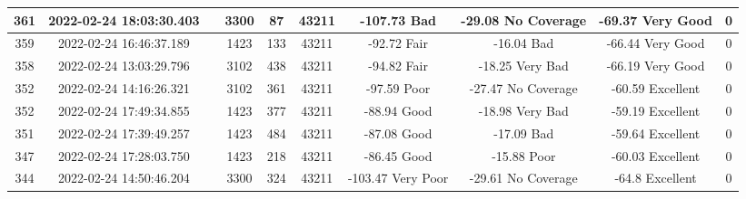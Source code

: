 \begin{longtable*}{|c|c|c|c|c|c|c|c|c|c|}
361&2022-02-24 18:03:30.403&&3300&87&43211& -107.73   Bad         & -29.08    No Coverage & -69.37    Very Good   & 0\\\hline
{}359&2022-02-24 16:46:37.189&&1423&133&43211& -92.72    Fair        & -16.04    Bad         & -66.44    Very Good   & 0\\\hline
{}358&2022-02-24 13:03:29.796&&3102&438&43211& -94.82    Fair        & -18.25    Very Bad    & -66.19    Very Good   & 0\\\hline
{}352&2022-02-24 14:16:26.321&&3102&361&43211& -97.59    Poor        & -27.47    No Coverage & -60.59    Excellent   & 0\\\hline
{}352&2022-02-24 17:49:34.855&&1423&377&43211& -88.94    Good        & -18.98    Very Bad    & -59.19    Excellent   & 0\\\hline
{}351&2022-02-24 17:39:49.257&&1423&484&43211& -87.08    Good        & -17.09    Bad         & -59.64    Excellent   & 0\\\hline
{}347&2022-02-24 17:28:03.750&&1423&218&43211& -86.45    Good        & -15.88    Poor        & -60.03    Excellent   & 0\\\hline
{}344&2022-02-24 14:50:46.204&&3300&324&43211& -103.47   Very Poor   & -29.61    No Coverage & -64.8     Excellent   & 0\\\hline

\end{longtable*}
